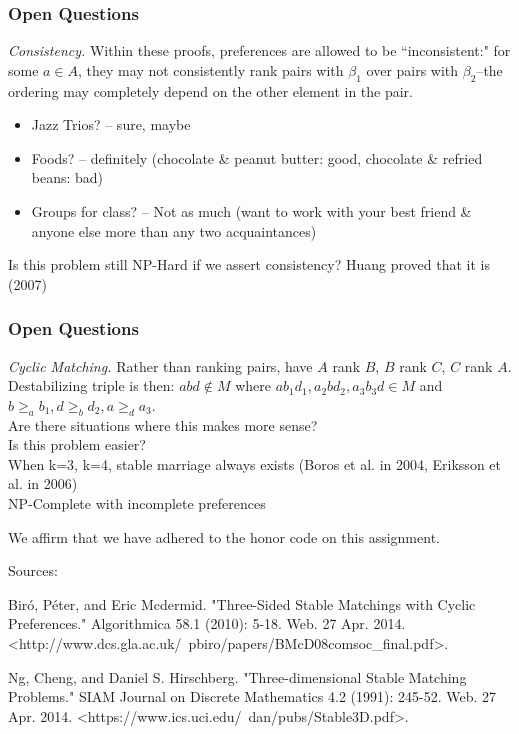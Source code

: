 \documentclass[mathserif,serif]{beamer}
\newcommand{\honor}{We affirm that we have adhered to the honor code on this assignment.}
\begin{document}
\begin{frame}

	\frametitle{Open Questions}

	\emph{Consistency.} Within these proofs, preferences are allowed to be ``inconsistent:" for some $a \in A$, they may not consistently rank pairs with $\beta_1$ over pairs with $\beta_2$--the ordering may completely depend on the other element in the pair. \\

		\begin{itemize}Does this ``make sense"/seem reasonable?\\ 
			\item Jazz Trios? -- sure, maybe\\
			\item Foods? -- definitely (chocolate \& peanut butter: good, chocolate \& refried beans: bad)\\
			\item Groups for class? -- Not as much (want to work with your best friend \& anyone else more than any two acquaintances)\\
		\end{itemize}
	\newline
	Is this problem still NP-Hard if we assert consistency?
	\newline
	Huang proved that it is (2007)
\end{frame}
\begin{frame}
	\frametitle{Open Questions}
	\emph{Cyclic Matching.} Rather than ranking pairs, have $A$ rank $B$, $B$ rank $C$, $C$ rank $A$.  \\
	Destabilizing triple is then: $abd \notin M$ where $a b_1 d_1, a_2 b d_2, a_3 b_3 d \in M$ and $b \geq_a b_1, d \geq_b d_2, a \geq_d a_3$.\\

	Are there situations where this makes more sense?\\ %
	Is this problem easier?\\
	
	When k=3, k=4, stable marriage always exists (Boros et al. in 2004, Eriksson et al. in 2006)\\
	
	NP-Complete with incomplete preferences\\

\end{frame}


\begin{frame}
	\honor
	
	Sources:
	
	Biró, Péter, and Eric Mcdermid. "Three-Sided Stable Matchings with Cyclic Preferences." Algorithmica 58.1 (2010): 5-18. Web. 27 Apr. 2014. <http://www.dcs.gla.ac.uk/~pbiro/papers/BMcD08comsoc_final.pdf>.

	Ng, Cheng, and Daniel S. Hirschberg. "Three-dimensional Stable Matching Problems." SIAM Journal on Discrete Mathematics 4.2 (1991): 245-52. Web. 27 Apr. 2014. <https://www.ics.uci.edu/~dan/pubs/Stable3D.pdf>.

	
\end{frame}

\end{document}
